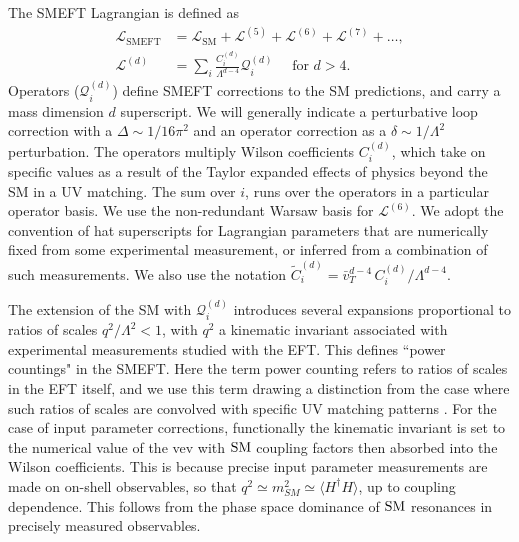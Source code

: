 \documentclass[twocolumn,nofootinbib,amsmath,amssymb,prl,aps,superscriptaddress,tightenlines,preprintnumbers]{revtex4}
\newcommand{\Lagr}{\mathcal{L}}
\begin{document}
The SMEFT Lagrangian is defined as
\begin{align}
	\Lagr_{\textrm{SMEFT}} &= \Lagr_{\textrm{SM}} + \Lagr^{(5)}+\Lagr^{(6)} +
	\Lagr^{(7)} + \dots,  \\ \nonumber \Lagr^{(d)} &= \sum_i \frac{C_i^{(d)}}{\Lambda^{d-4}}\mathcal{Q}_i^{(d)}
	\quad \textrm{ for } d>4.
\end{align}
Operators ($\mathcal{Q}_i^{(d)}$) define SMEFT corrections to the SM predictions,
and carry a mass dimension $d$ superscript.
We will generally indicate a perturbative loop correction with a $\Delta \sim 1/16 \pi^2$ and an operator correction as a $\delta \sim 1/\Lambda^2$ perturbation.
The operators multiply Wilson coefficients $C_i^{(d)}$,
which take on specific values as a result of the Taylor expanded effects of physics beyond the SM in a
UV matching. The sum over $i$, runs over the operators in a particular operator basis.
We use the non-redundant Warsaw basis \cite{Buchmuller:1985jz,Grzadkowski:2010es} for $\Lagr^{(6)}$.
We adopt the convention of hat superscripts for Lagrangian parameters that are numerically fixed
from some experimental measurement, or inferred from a combination of such measurements.
We also use the notation $\tilde{C}_{i}^{(d)} = \bar{v}_T^{d-4} \, C_i^{(d)}/\Lambda^{d-4}$.


The extension of the SM with $\mathcal{Q}_i^{(d)}$ introduces several expansions
proportional to
ratios of scales $q^2/\Lambda^2 <1$, with $q^2$ a kinematic invariant associated
with experimental measurements studied with the EFT.
This defines ``power countings" \cite{Manohar:1983md,Manohar:1996cq,Brivio:2017vri,Isidori:2023pyp} in the SMEFT. Here the term power counting
refers to ratios of scales in the EFT itself, and we use this term drawing a distinction from the case
where such ratios of scales are convolved with specific UV matching patterns \cite{Luty:1997fk,Contino:2016jqw,Brivio:2022pyi}.
For the case of input parameter corrections, functionally the kinematic invariant
is set to the numerical value of the vev with $\rm SM$ coupling factors then absorbed
into the Wilson coefficients. This is because precise input parameter measurements are made on
on-shell observables, so that  $q^2 \simeq m_{SM}^2 \simeq \langle H^\dagger H\rangle$, up to coupling dependence.
This follows from the phase space dominance of $\rm SM$ resonances in precisely measured observables.
\end{document}
